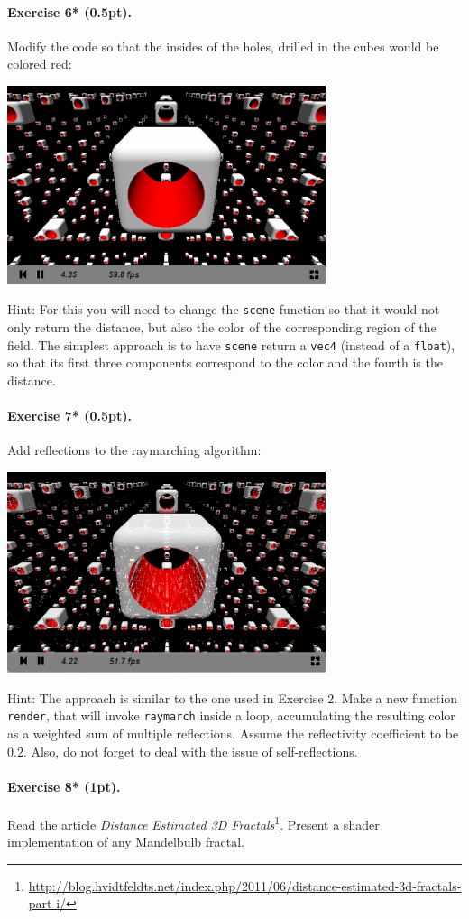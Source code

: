 \documentclass{article}
\newenvironment{exercise}[2]{\paragraph{Exercise #1 (#2pt).} }{
\medskip}
\begin{document}
\begin{exercise}{6*}{0.5}
Modify the code so that the insides of the holes, drilled in the cubes would be colored red:
\begin{center}
\includegraphics[width=0.7\textwidth]{raymarching3.png}
\end{center}
Hint: For this you will need to change the \texttt{scene} function so that it would not only return the distance, but also the color of the corresponding region of the field. The simplest approach is to have \texttt{scene} return a \texttt{vec4} (instead of a \texttt{float}), so that its first three components correspond to the color and the fourth is the distance.
\end{exercise}

\begin{exercise}{7*}{0.5}
Add reflections to the raymarching algorithm:
\begin{center}
\includegraphics[width=0.7\textwidth]{raymarching4.png}
\end{center}
Hint: The approach is similar to the one used in Exercise 2. Make a new function \texttt{render}, that will invoke \texttt{raymarch} inside a loop, accumulating the resulting color as a weighted sum of multiple reflections. Assume the reflectivity coefficient to be $0.2$. Also, do not forget to deal with the issue of self-reflections.
\end{exercise}


\begin{exercise}{8*}{1}
Read the article \emph{Distance Estimated 3D Fractals}\footnote{\url{http://blog.hvidtfeldts.net/index.php/2011/06/distance-estimated-3d-fractals-part-i/}}. Present a shader implementation of any Mandelbulb fractal.
\end{exercise}
\end{document}
